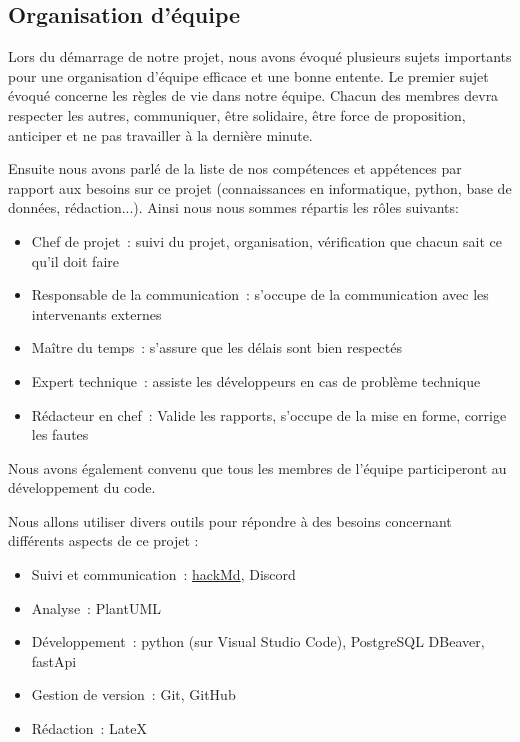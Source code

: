 \documentclass[11pt]{article}
\begin{document}
\subsection{Organisation d'équipe}

Lors du démarrage de notre projet, nous avons évoqué plusieurs sujets importants pour une organisation d'équipe efficace et une bonne entente. Le premier sujet évoqué concerne les règles de vie dans notre équipe. Chacun des membres devra respecter les autres, communiquer, être solidaire, être force de proposition, anticiper et ne pas travailler à la dernière minute.


\bigbreak

Ensuite nous avons parlé de la liste de nos compétences et appétences par rapport aux besoins sur ce projet (connaissances en informatique, python, base de données, rédaction...). Ainsi nous nous sommes répartis les rôles suivants:
\begin{itemize}
    \item{Chef de projet~: suivi du projet, organisation, vérification que chacun sait ce qu’il doit faire}
    \item{Responsable de la communication~: s'occupe de la communication avec les intervenants externes}
    \item{Maître du temps~: s’assure que les délais sont bien respectés}
    \item{Expert technique~: assiste les développeurs en cas de problème technique}
    \item{Rédacteur en chef~: Valide les rapports, s'occupe de la mise en forme, corrige les fautes}
\end{itemize}

Nous avons également convenu que tous les membres de l'équipe participeront au développement du code.

\bigbreak

Nous allons utiliser divers outils pour répondre à des besoins concernant différents aspects de ce projet :
\begin{itemize}
    \item{Suivi et communication~: \href{https://hackmd.io/CMTCDVW6Spe2PHXOhdKTRQ}{hackMd}, Discord}
    \item{Analyse~: PlantUML}
    \item{Développement~: python (sur Visual Studio Code), PostgreSQL DBeaver, fastApi}
    \item{Gestion de version~: Git, GitHub}
    \item{Rédaction~: LateX}
\end{itemize}
\end{document}
